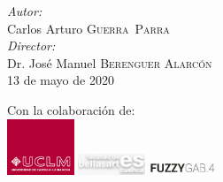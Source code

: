\begin{titlepage}
\emph{Autor:}\\
Carlos Arturo \textsc{Guerra~Parra} %
\\[0.5cm]
\emph{Director:} \\
Dr. José Manuel \textsc{Berenguer Alarcón} %
\\[0.5cm]



{\large 13 de mayo de 2020} %


 

\vfill %

{\scriptsize Con la colaboración de:}\\[0.2cm]
\includegraphics[width=0.15\textwidth]{./portada/logoUCLM}
\includegraphics[width=0.15\textwidth]{./portada/logoBellasartes}
\includegraphics[width=0.15\textwidth]{./portada/logoFuzzyGab}

\end{titlepage}